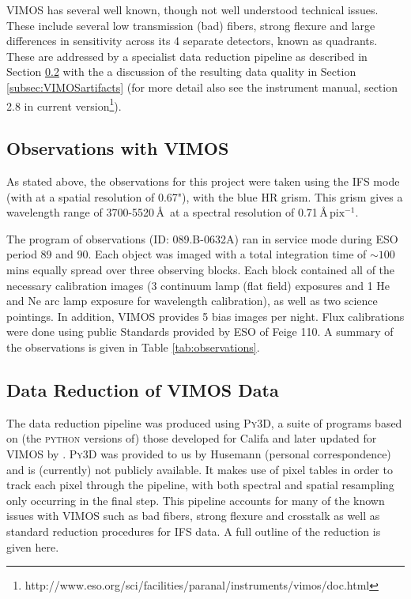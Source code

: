 		VIMOS has several well known, though not well understood technical issues. These include several low transmission (bad) fibers, strong flexure and large differences in sensitivity across its 4 separate detectors, known as quadrants. These are addressed by a specialist data reduction pipeline as described in Section \ref{subsec:VIMOSreduction} with the a discussion of the resulting data quality in Section \ref{subsec:VIMOSartifacts} (for more detail also see the instrument manual, section 2.8 in current version\footnote{http://www.eso.org/sci/facilities/paranal/instruments/vimos/doc.html}).

	\subsection{Observations with VIMOS}
		As stated above, the observations for this project were taken using the IFS mode (with at a spatial resolution of 0.67"), with the blue HR grism. This grism gives a wavelength range of 3700-5520\,\AA\ at a spectral resolution of 0.71\,\AA\,$\mathrm{pix^{-1}}$. 

		The program of observations (ID: 089.B-0632A) ran in service mode during ESO period 89 and 90. Each object was imaged with a total integration time of $\sim 100$ mins equally spread over three observing blocks. Each block contained all of the necessary calibration images (3 continuum lamp (flat field) exposures and 1 He and Ne arc lamp exposure for wavelength calibration), as well as two science pointings. In addition, VIMOS provides 5 bias images per night. Flux calibrations were done using public Standards provided by ESO of Feige 110. A summary of the observations is given in Table \ref{tab:observations}.

		


	\subsection{Data Reduction of VIMOS Data}
		\label{subsec:VIMOSreduction}
		The data reduction pipeline was produced using \textsc{Py3D}, a suite of programs based on (the \textsc{python} versions of) those developed for Califa \citep{Sanchez2012, Husemann2013} and later updated for VIMOS by \citet{Husemann2014}. \textsc{Py3D} was provided to us by Husemann (personal correspondence) and is (currently) not publicly available. It  makes use of pixel tables in order to track each pixel through the pipeline, with both spectral and spatial resampling only occurring in the final step. This pipeline accounts for many of the known issues with VIMOS such as bad fibers, strong flexure and crosstalk as well as standard reduction procedures for IFS data. A full outline of the reduction is given here.

